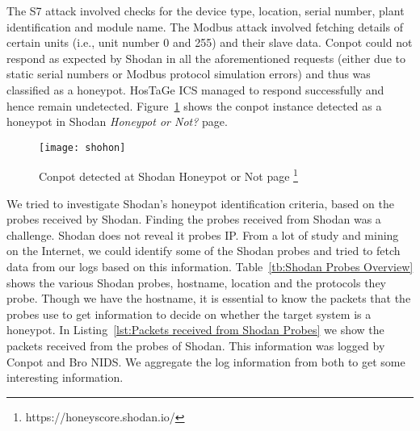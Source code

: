 \documentclass[article,msc=informatik,type=msc,colorback,accentcolor=tud9c]{tudthesis}
\begin{document}
		
		
		The S7 attack involved checks for the device type, location, serial number, plant identification and module name. The Modbus attack involved fetching details of certain units (i.e., unit number 0 and 255) and their slave data. Conpot could not respond as expected by Shodan in all the aforementioned requests (either due to static serial numbers or Modbus protocol simulation errors) and thus was classified as a honeypot. HosTaGe ICS managed to respond successfully and hence remain undetected. Figure~\ref{f:Conpot detected at Shodan Honeypot or Not page } shows the conpot instance detected as a honeypot in Shodan \textit{Honeypot or Not?} page.
		
			
			\begin{figure}[H]
					\centering
					\texttt{[image: shohon]}
					\caption[Conpot detected at Shodan Honeypot or Not page ]{\label{f:Conpot detected at Shodan Honeypot or Not page }Conpot detected at Shodan Honeypot or Not page \footnote{https://honeyscore.shodan.io/}}
					\end{figure}
		
		We tried to investigate Shodan's honeypot identification criteria, based on the probes received by Shodan. Finding the probes received from Shodan was a challenge. Shodan does not reveal it probes \ac{IP}. From a lot of study and mining on the Internet, we could identify some of the Shodan probes and tried to fetch data from our logs based on this information. Table~\ref{tb:Shodan Probes Overview} shows the various Shodan probes, hostname, location and the protocols they probe. Though we have the hostname, it is essential to know the packets that the probes use to get information to decide on whether the target system is a honeypot. In Listing~\ref{lst:Packets received from Shodan Probes} we show the packets received from the probes of Shodan. This information was logged by Conpot and Bro \ac{NIDS}. We aggregate the log information from both to get some interesting information. 
		
		
		
\end{document}
